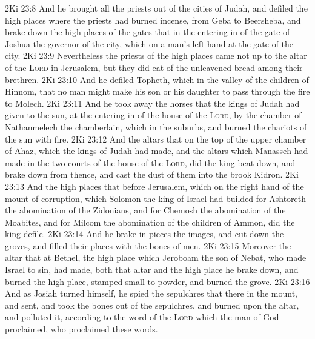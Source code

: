 \vs 2Ki 23:8 And he brought all the priests out of the cities of Judah, and defiled the high places where the priests had burned incense, from Geba to Beersheba, and brake down the high places of the gates that  in the entering in of the gate of Joshua the governor of the city, which  on a man's left hand at the gate of the city.
\vs 2Ki 23:9 Nevertheless the priests of the high places came not up to the altar of the \textsc{Lord} in Jerusalem, but they did eat of the unleavened bread among their brethren.
\vs 2Ki 23:10 And he defiled Topheth, which  in the valley of the children of Hinnom, that no man might make his son or his daughter to pass through the fire to Molech.
\vs 2Ki 23:11 And he took away the horses that the kings of Judah had given to the sun, at the entering in of the house of the \textsc{Lord}, by the chamber of Nathanmelech the chamberlain, which  in the suburbs, and burned the chariots of the sun with fire.
\vs 2Ki 23:12 And the altars that  on the top of the upper chamber of Ahaz, which the kings of Judah had made, and the altars which Manasseh had made in the two courts of the house of the \textsc{Lord}, did the king beat down, and brake  down from thence, and cast the dust of them into the brook Kidron.
\vs 2Ki 23:13 And the high places that  before Jerusalem, which  on the right hand of the mount of corruption, which Solomon the king of Israel had builded for Ashtoreth the abomination of the Zidonians, and for Chemosh the abomination of the Moabites, and for Milcom the abomination of the children of Ammon, did the king defile.
\vs 2Ki 23:14 And he brake in pieces the images, and cut down the groves, and filled their places with the bones of men.
\vs 2Ki 23:15 Moreover the altar that  at Bethel,  the high place which Jeroboam the son of Nebat, who made Israel to sin, had made, both that altar and the high place he brake down, and burned the high place,  stamped  small to powder, and burned the grove.
\vs 2Ki 23:16 And as Josiah turned himself, he spied the sepulchres that  there in the mount, and sent, and took the bones out of the sepulchres, and burned  upon the altar, and polluted it, according to the word of the \textsc{Lord} which the man of God proclaimed, who proclaimed these words.
